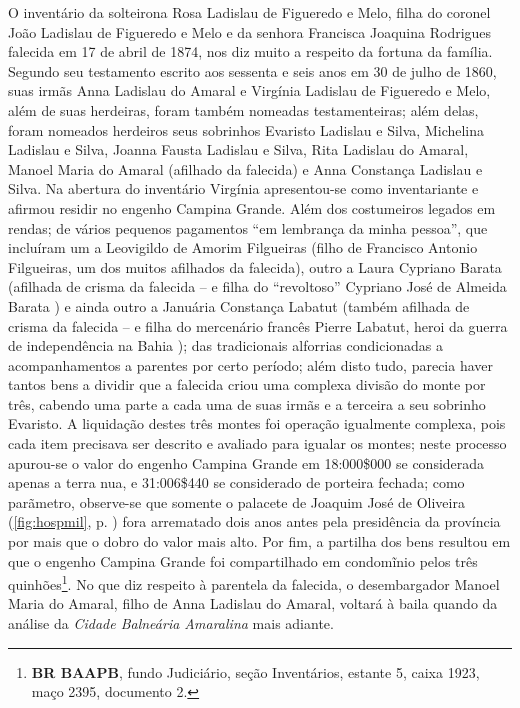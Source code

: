 O inventário da solteirona Rosa Ladislau de Figueredo e Melo, filha do coronel João Ladislau de Figueredo e Melo e da senhora Francisca Joaquina Rodrigues falecida em 17 de abril de 1874, nos diz muito a respeito da fortuna da família. Segundo seu testamento escrito aos sessenta e seis anos em 30 de julho de 1860, suas irmãs Anna Ladislau do Amaral e Virgínia Ladislau de Figueredo e Melo, além de suas herdeiras, foram também nomeadas testamenteiras; além delas, foram nomeados herdeiros seus sobrinhos Evaristo Ladislau e Silva, Michelina Ladislau e Silva, Joanna Fausta Ladislau e Silva, Rita Ladislau do Amaral, Manoel Maria do Amaral (afilhado da falecida) e Anna Constança Ladislau e Silva. Na abertura do inventário Virgínia apresentou-se como inventariante e afirmou residir no engenho Campina Grande. Além dos costumeiros legados em rendas; de vários pequenos pagamentos ``em lembrança da minha pessoa'', que incluíram um a Leovigildo de Amorim Filgueiras (filho de Francisco Antonio Filgueiras, um dos muitos afilhados da falecida), outro a Laura Cypriano Barata (afilhada de crisma da falecida -- e filha do ``revoltoso'' Cypriano José de Almeida Barata \cite{morel_barata_2001}) e ainda outro a Januária Constança Labatut (também afilhada de crisma da falecida -- e filha do mercenário francês Pierre Labatut, heroi da guerra de independência na Bahia \cite{senado_anais_1851}); das tradicionais alforrias condicionadas a acompanhamentos a parentes por certo período; além disto tudo, parecia haver tantos bens a dividir que a falecida criou uma complexa divisão do monte por três, cabendo uma parte a cada uma de suas irmãs e a terceira a seu sobrinho Evaristo. A liquidação destes três montes foi operação igualmente complexa, pois cada item precisava ser descrito e avaliado para igualar os montes; neste processo apurou-se o valor do engenho Campina Grande em 18:000\$000 se considerada apenas a terra nua, e 31:006\$440 se considerado de porteira fechada; como parãmetro, observe-se que somente o palacete de Joaquim José de Oliveira (\autoref{fig:hospmil}, p. \pageref{fig:hospmil}) fora arrematado dois anos antes pela presidência da província por mais que o dobro do valor mais alto. Por fim, a partilha dos bens resultou em que o engenho Campina Grande foi compartilhado em condomĩnio pelos três quinhões\footnote{\textbf{BR BAAPB}, fundo Judiciário, seção Inventários, estante 5, caixa 1923, maço 2395, documento 2.}. No que diz respeito à parentela da falecida, o desembargador Manoel Maria do Amaral, filho de Anna Ladislau do Amaral, voltará à baila quando da análise da \textit{Cidade Balneária Amaralina} mais adiante.

